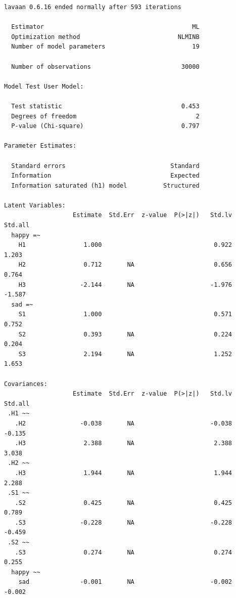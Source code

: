 \documentclass[
  letterpaper,
  DIV=11,
  numbers=noendperiod]{scrreprt}
\begin{document}
\begin{verbatim}
lavaan 0.6.16 ended normally after 593 iterations

  Estimator                                         ML
  Optimization method                           NLMINB
  Number of model parameters                        19

  Number of observations                         30000

Model Test User Model:
                                                      
  Test statistic                                 0.453
  Degrees of freedom                                 2
  P-value (Chi-square)                           0.797

Parameter Estimates:

  Standard errors                             Standard
  Information                                 Expected
  Information saturated (h1) model          Structured

Latent Variables:
                   Estimate  Std.Err  z-value  P(>|z|)   Std.lv  Std.all
  happy =~                                                              
    H1                1.000                               0.922    1.203
    H2                0.712       NA                      0.656    0.764
    H3               -2.144       NA                     -1.976   -1.587
  sad =~                                                                
    S1                1.000                               0.571    0.752
    S2                0.393       NA                      0.224    0.204
    S3                2.194       NA                      1.252    1.653

Covariances:
                   Estimate  Std.Err  z-value  P(>|z|)   Std.lv  Std.all
 .H1 ~~                                                                 
   .H2               -0.038       NA                     -0.038   -0.135
   .H3                2.388       NA                      2.388    3.038
 .H2 ~~                                                                 
   .H3                1.944       NA                      1.944    2.288
 .S1 ~~                                                                 
   .S2                0.425       NA                      0.425    0.789
   .S3               -0.228       NA                     -0.228   -0.459
 .S2 ~~                                                                 
   .S3                0.274       NA                      0.274    0.255
  happy ~~                                                              
    sad              -0.001       NA                     -0.002   -0.002


\end{verbatim}
\end{document}

